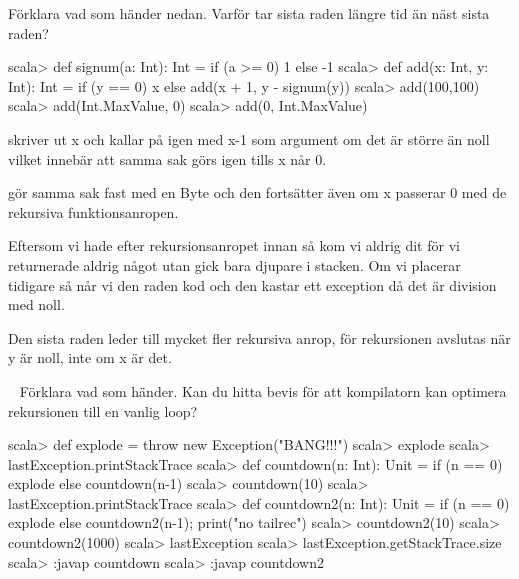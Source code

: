 \Subtask Förklara vad som händer nedan. Varför tar sista raden längre tid än näst sista raden?
\begin{REPL}
scala> def signum(a: Int): Int = if (a >= 0) 1 else -1
scala> def add(x: Int, y: Int): Int =
         if (y == 0) x else add(x + 1, y - signum(y))
scala> add(100,100)
scala> add(Int.MaxValue, 0)
scala> add(0, Int.MaxValue)
\end{REPL}


\SOLUTION

\TaskSolved \what

\SubtaskSolved
{} skriver ut x och kallar på  igen med x-1 som argument om det är större än noll vilket innebär att samma sak görs igen tills x når 0.

 gör samma sak fast med en Byte och den fortsätter även om x passerar 0 med de rekursiva funktionsanropen.

\SubtaskSolved
Eftersom vi hade  efter rekursionsanropet innan så kom vi aldrig dit för vi returnerade aldrig något utan gick bara djupare i stacken. Om vi placerar  tidigare så når vi den raden kod och den kastar ett exception då det är division med noll.

\SubtaskSolved
Den sista raden leder till mycket fler rekursiva anrop, för rekursionen avslutas när y är noll, inte om x är det.

\QUESTEND





\QUESTBEGIN

\Task  \what~  Förklara vad som händer. Kan du hitta bevis för att kompilatorn kan optimera rekursionen till en vanlig loop?

\begin{REPL}
scala> def explode = throw new Exception("BANG!!!")
scala> explode
scala> lastException.printStackTrace
scala> def countdown(n: Int): Unit =
         if (n == 0) explode else countdown(n-1)
scala> countdown(10)
scala> lastException.printStackTrace
scala> def countdown2(n: Int): Unit =
         if (n == 0) explode else {countdown2(n-1); print("no tailrec")}
scala> countdown2(10)
scala> countdown2(1000)
scala> lastException
scala> lastException.getStackTrace.size
scala> :javap countdown
scala> :javap countdown2
\end{REPL}

\SOLUTION


\QUESTEND



